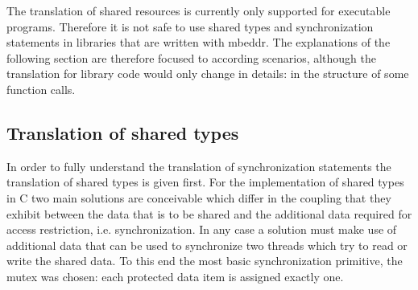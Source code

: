 The translation of shared resources is currently only supported for executable programs. Therefore it is not safe to use shared types and synchronization statements in libraries that are written with mbeddr. The explanations of the following section are therefore focused to according scenarios, although the translation for library code would only change in details: in the structure of some function calls.

\subsection{Translation of shared types}
\label{sharedTypesTranslation}
In order to fully understand the translation of synchronization statements the translation of shared types is given first. For the implementation of shared types in C two main solutions are conceivable which differ in the coupling that they exhibit between the data that is to be shared and the additional data required for access restriction, i.e. synchronization. In any case a solution must make use of additional data that can be used to synchronize two threads which try to read or write the shared data. To this end the most basic synchronization primitive, the mutex was chosen: each protected data item is assigned exactly one. 


